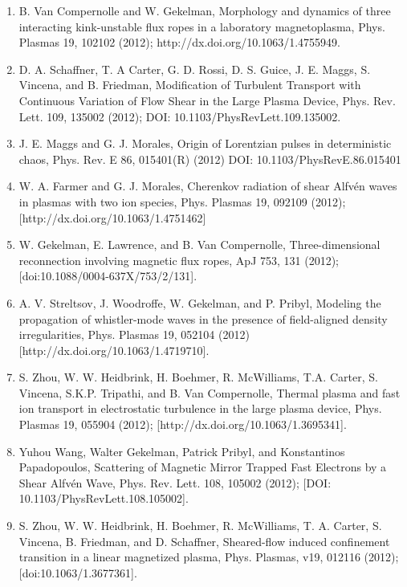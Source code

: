 \documentclass[11pt]{article}
\begin{document}
\begin{enumerate}
\item B. Van Compernolle and W. Gekelman, Morphology and dynamics of three interacting kink-unstable flux ropes in a laboratory magnetoplasma, Phys. Plasmas 19, 102102 (2012); http://dx.doi.org/10.1063/1.4755949.

\item D. A. Schaffner, T. A Carter, G. D. Rossi, D. S. Guice, J. E. Maggs, S. Vincena, and B. Friedman, Modification of Turbulent Transport with Continuous Variation of Flow Shear in the Large Plasma Device, Phys. Rev. Lett. 109, 135002 (2012); DOI: 10.1103/PhysRevLett.109.135002.

\item J. E. Maggs and G. J. Morales, Origin of Lorentzian pulses in deterministic chaos, Phys. Rev. E 86, 015401(R) (2012) DOI: 10.1103/PhysRevE.86.015401

\item  W. A. Farmer and G. J. Morales, Cherenkov radiation of shear Alfv\'{e}n waves in plasmas with two ion species, Phys. Plasmas 19, 092109 (2012); [http://dx.doi.org/10.1063/1.4751462]

\item  W. Gekelman, E. Lawrence, and B. Van Compernolle, Three-dimensional reconnection involving magnetic flux ropes, ApJ 753, 131  (2012); [doi:10.1088/0004-637X/753/2/131].

\item  A. V. Streltsov, J. Woodroffe, W. Gekelman, and P. Pribyl, Modeling the propagation of whistler-mode waves in the presence of field-aligned density irregularities, Phys. Plasmas 19, 052104 (2012) [http://dx.doi.org/10.1063/1.4719710].

\item  S. Zhou, W. W. Heidbrink, H. Boehmer, R. McWilliams, T.A. Carter, S. Vincena, S.K.P. Tripathi, and B. Van Compernolle, Thermal plasma and fast ion transport in electrostatic turbulence in the large plasma device, Phys. Plasmas  19, 055904 (2012); [http://dx.doi.org/10.1063/1.3695341].

\item  Yuhou Wang, Walter Gekelman, Patrick Pribyl, and Konstantinos Papadopoulos, Scattering of Magnetic Mirror Trapped Fast Electrons by a Shear Alfv\'{e}n Wave, Phys. Rev. Lett. 108, 105002 (2012); [DOI: 10.1103/PhysRevLett.108.105002].

\item   S. Zhou, W. W. Heidbrink, H. Boehmer, R. McWilliams, T. A. Carter, S. Vincena, B. Friedman, and D. Schaffner, Sheared-flow induced confinement transition in a linear magnetized plasma, Phys. Plasmas, v19, 012116 (2012); [doi:10.1063/1.3677361].


\end{enumerate}
\end{document}
